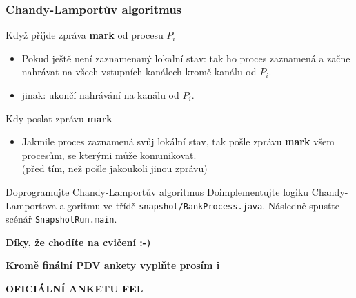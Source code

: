 \documentclass[usenames,dvipsnames,9pt]{beamer}
\begin{document}
\begin{frame}
\frametitle{Chandy-Lamportův algoritmus}
Když přijde zpráva {\bf mark} od procesu $P_i$
\begin{itemize}
\item Pokud ještě není zaznamenaný lokalní stav: tak ho proces zaznamená a začne nahrávat na všech vstupních kanálech kromě kanálu od $P_i$.
\item jinak: ukončí nahrávání na kanálu od $P_i$.
\end{itemize}

Kdy poslat zprávu {\bf mark}
\begin{itemize}
\item Jakmile proces zaznamená svůj lokální stav, tak pošle zprávu {\bf mark} všem procesům, se kterými může komunikovat.\\ {\small (před tím, než pošle jakoukoli jinou zprávu)}
\end{itemize}
  \vspace{1em}
\begin{block}{Doprogramujte Chandy-Lamportův algoritmus}
    Doimplementujte logiku Chandy-Lamportova algoritmu ve třídě \texttt{snapshot/BankProcess.java}. Následně spusťte scénář \texttt{SnapshotRun.main}.
  \end{block}
\end{frame}

\begin{frame}[standout]
    \begin{center}
      \textbf{\large Díky, že chodíte na cvičení :-)}
    \end{center}
    \vspace{3em}
    \begin{center}
      \textbf{\small Kromě finální PDV ankety vyplňte prosím i}

      \textbf{\LARGE OFICIÁLNÍ ANKETU FEL}
    \end{center}
    \vspace{3em}
\end{frame}



\end{document}

